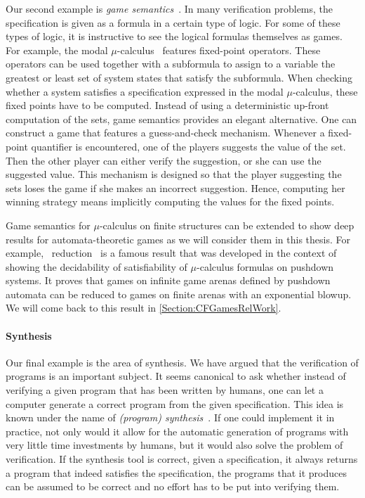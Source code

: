 \documentclass[../../diss.tex]{subfiles}
\begin{document}
Our second example is \emph{game semantics}~\cite{LorenzenL78}.
In many verification problems, the specification is given as a formula in a certain type of logic.
For some of these types of logic, it is instructive to see the logical formulas themselves as games.
For example, the modal $\mu$-calculus~\cite{BradfieldW18} features fixed-point operators.
These operators can be used together with a subformula to assign to a variable the greatest or least set of system states that satisfy the subformula.
When checking whether a system satisfies a specification expressed in the modal $\mu$-calculus, these fixed points have to be computed.
Instead of using a deterministic up-front computation of the sets, game semantics provides an elegant alternative.
One can construct a game that features a guess-and-check mechanism.
Whenever a fixed-point quantifier is encountered, one of the players suggests the value of the set.
Then the other player can either verify the suggestion, or she can use the suggested value.
This mechanism is designed so that the player suggesting the sets loses the game if she makes an incorrect suggestion.
Hence, computing her winning strategy means implicitly computing the values for the fixed points.

Game semantics for $\mu$-calculus on finite structures can be extended to show deep results for automata-theoretic games as we will consider them in this thesis.
For example, \Walus~reduction~\cite{Walukiewicz01} is a famous result that was developed in the context of showing the decidability of satisfiability of $\mu$-calculus formulas on pushdown systems.
It proves that games on infinite game arenas defined by pushdown automata can be reduced to games on finite arenas with an exponential blowup.
We will come back to this result in \cref{Section:CFGamesRelWork}.

\paragraph{Synthesis}

Our final example is the area of synthesis.
We have argued that the verification of programs is an important subject.
It seems canonical to ask whether instead of verifying a given program that has been written by humans, one can let a computer generate a correct program from the given specification.
This idea is known under the name of \emph{(program) synthesis}~\cite{Church63,MannaW80}.
If one could implement it in practice, not only would it allow for the automatic generation of programs with very little time investments by humans, but it would also solve the problem of verification.
If the synthesis tool is correct, \ie given a specification, it always returns a program that indeed satisfies the specification, the programs that it produces can be assumed to be correct and no effort has to be put into verifying them.
\end{document}
